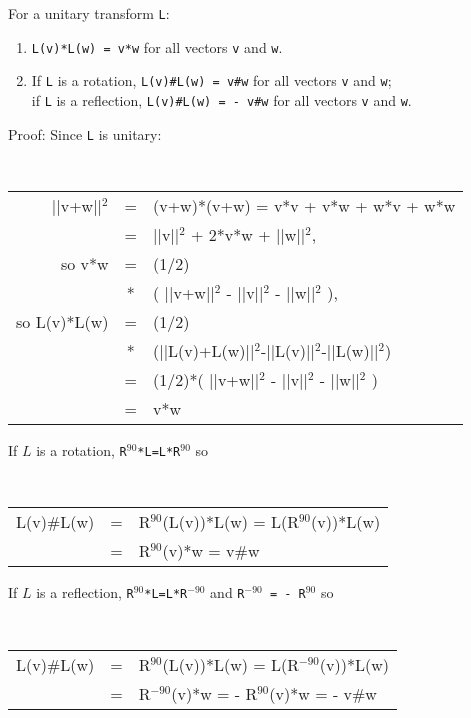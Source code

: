\documentclass[12pt]{article}
\begin{document}
\begin{lemma}
For a unitary transform {\tt L}:
\begin{enumerate}
\item {\tt L(v)*L(w) = v*w} for all vectors {\tt v} and {\tt w}.
\item If {\tt L} is a rotation,
         {\tt L(v)\#L(w) = v\#w} for all vectors {\tt v} and {\tt w}; \\
      if {\tt L} is a reflection,
         {\tt L(v)\#L(w) = - v\#w} for all vectors {\tt v} and {\tt w}.
\end{enumerate}
\end{lemma}

\begin{indpar}{0.3in}
Proof: Since {\tt L} is unitary: \\
{\small \tt
\hspace*{0.05in}
       \begin{tabular}[t]{rcl}
       ||v+w||$^2$ & = & (v+w)*(v+w) = v*v + v*w + w*v + w*w \\
		   & = & ||v||$^2$ + 2*v*w + ||w||$^2${\rm ,} \\
       {\rm so} v*w & = & (1/2) \\
                    & * & ( ||v+w||$^2$ - ||v||$^2$ - ||w||$^2$ ){\rm ,} \\
       {\rm so} L(v)*L(w)
         & = & (1/2) \\
	 & * & (||L(v)+L(w)||$^2$-||L(v)||$^2$-||L(w)||$^2$) \\
         & = & (1/2)*( ||v+w||$^2$ - ||v||$^2$ - ||w||$^2$ ) \\
         & = & v*w
       \end{tabular}
} %

If $L$ is a rotation, {\tt R$^{90}$*L=L*R$^{90}$} so \\
{\tt
\hspace*{0.1in}
       \begin{tabular}[t]{rcl}
       L(v)\#L(w) & = & R$^{90}$(L(v))*L(w) = L(R$^{90}$(v))*L(w) \\
                  & = & R$^{90}$(v)*w = v\#w \\
       \end{tabular}
} %

If $L$ is a reflection, {\tt R$^{90}$*L=L*R$^{-90}$}
and {\tt R$^{-90}$ = - R$^{90}$} so \\
{\tt
\hspace*{0.1in}
       \begin{tabular}[t]{rcl}
       L(v)\#L(w) & = & R$^{90}$(L(v))*L(w) = L(R$^{-90}$(v))*L(w) \\
                  & = & R$^{-90}$(v)*w = - R$^{90}$(v)*w = - v\#w
       \end{tabular}
} %
\end{indpar}
\end{document}
